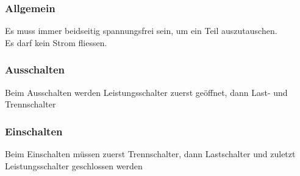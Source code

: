 \subsubsection{Allgemein}
Es muss immer beidseitig spannungsfrei sein, um ein Teil auszutauschen.\\
Es darf kein Strom fliessen.

\subsubsection{Ausschalten}
Beim Ausschalten werden Leistungsschalter zuerst geöffnet, dann Last- und Trennschalter
\subsubsection{Einschalten}
Beim Einschalten müssen zuerst Trennschalter, dann Lastschalter und zuletzt Leistungsschalter geschlossen werden






